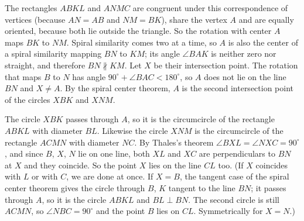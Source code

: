 %
{
    The rectangles $ABKL$ and $ANMC$ are congruent under this correspondence of vertices (because $AN = AB$ and $NM = BK$), share the vertex $A$ and are equally oriented, because both lie outside the triangle. So the rotation with center $A$ maps $BK$ to $NM$. Spiral similarity comes two at a time, so $A$ is also the center of a spiral similarity mapping $BN$ to $KM$; its angle $\angle BAK$ is neither zero nor straight, and therefore $BN \nparallel KM$. Let $X$ be their intersection point. The rotation that maps $B$ to $N$ has angle $90^\circ + \angle BAC < 180^\circ$, so $A$ does not lie on the line $BN$ and $X \neq A$. By the spiral center theorem, $A$ is the second intersection point of the circles $XBK$ and $XNM$.


    The circle $XBK$ passes through $A$, so it is the circumcircle of the rectangle $ABKL$ with diameter $BL$. Likewise the circle $XNM$ is the circumcircle of the rectangle $ACMN$ with diameter $NC$. By Thales's theorem $\angle BXL = \angle NXC = 90^\circ$, and since $B$, $X$, $N$ lie on one line, both $XL$ and $XC$ are perpendiculars to $BN$ at $X$ and they coincide. So the point $X$ lies on the line $CL$ too. (If $X$ coincides with $L$ or with $C$, we are done at once. If $X = B$, the tangent case of the spiral center theorem gives the circle through $B$, $K$ tangent to the line $BN$; it passes through $A$, so it is the circle $ABKL$ and $BL \perp BN$. The second circle is still $ACMN$, so $\angle NBC = 90^\circ$ and the point $B$ lies on $CL$. Symmetrically for $X = N$.)
}

